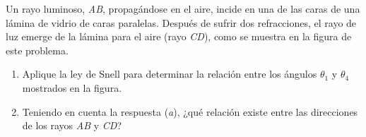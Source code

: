 
Un rayo luminoso, \textit{AB}, propagándose en el aire, incide en una de las caras de una lámina de vidrio de caras paralelas. Después de sufrir dos refracciones, el rayo de luz emerge de la lámina para el aire (rayo \textit{CD}), como se muestra en la figura de este problema.
\begin{enumerate}
    \item Aplique la ley de Snell para determinar la relación entre los ángulos $\theta_1$ y $\theta_4$ mostrados en la figura.
    \item Teniendo en cuenta la respuesta (\textit{a}), ¿qué relación existe entre las direcciones de los rayos \textit{AB} y \textit{CD}?
\end{enumerate}